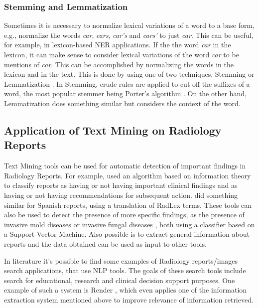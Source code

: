 \subsubsection{Stemming and Lemmatization}

Sometimes it is necessary to normalize lexical variations of a word to a base form, e.g., normalize the words \textit{car}, \textit{cars}, \textit{car’s} and \textit{cars’} to just \textit{car}. This can be useful, for example, in lexicon-based NER applications. If the the word \textit{car} in the lexicon, it can make sense to consider lexical variations of the word \textit{car} to be mentions of \textit{car}. This can be accomplished by normalizing the words in the lexicon and in the text. This is done by using one of two techniques, Stemming or Lemmatization \citep{Manning2009c}. In Stemming, crude rules are applied to cut off the suffixes of a word, the most popular stemmer being Porter’s algorithm \citep{Porter1980}. On the other hand, Lemmatization does something similar but considers the context of the word.  

\subsection{Application of Text Mining on Radiology Reports}

Text Mining tools can be used for automatic detection of important findings in Radiology Reports. For example, \citep{Dreyer2005} used an algorithm based on information theory to classify reports as having or not having important clinical findings and as having or not having recommendations for subsequent action. \citep{Cotik2015} did something similar for Spanish reports, using a translation of RadLex terms. These tools can also be used to detect the presence of more specific findings, as the presence of invasive mold diseases  \citep{Ananda-Rajah2014a} or invasive fungal diseases \citep{Martinez2015}, both using a classifier based on a Support Vector Machine. Also possible is to extract general information about reports \citep{Hassanpour2016} and the data obtained can be used as input to other tools.

In literature it's possible to find some examples of Radiology reports/images search applications, that use NLP tools. The goals of these search tools include search for educational, research and clinical decision support purposes. One example of such a system is Render \citep{Dang2009}, which even applies one of the information extraction system mentioned above \citep{Dreyer2005} to improve relevance of information retrieved.

